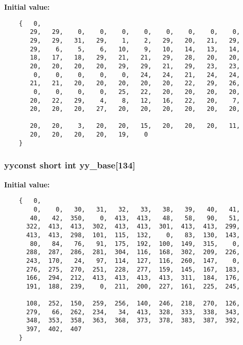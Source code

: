 {\bf Initial value:}

\footnotesize\begin{verbatim}
    {   0,
       29,   29,    0,    0,    0,    0,    0,    0,    0,    0,
       29,   29,   31,   29,    1,    2,   29,   20,   21,   29,
       29,    6,    5,    6,   10,    9,   10,   14,   13,   14,
       18,   17,   18,   29,   21,   21,   29,   28,   20,   20,
       20,   20,   20,   20,   29,   29,   21,   29,   23,   23,
        0,    0,    0,    0,    0,   24,   24,   21,   24,   24,
       21,   21,   20,   20,   20,   20,   20,   22,   29,   26,
        0,    0,    0,    0,   25,   22,   20,   20,   20,   20,
       20,   22,   29,    4,    8,   12,   16,   22,   20,    7,
       20,   20,   20,   27,   20,   20,   20,   20,   20,   20,

       20,   20,    3,   20,   20,   15,   20,   20,   20,   11,
       20,   20,   20,   20,   19,    0
    }\end{verbatim}\normalsize 
{}
\subsubsection{\setlength{\rightskip}{0pt plus 5cm}yyconst short int yy\_\-base[134]\hspace{0.3cm}{\tt  [static]}}\label{vcd__lexer_8c_a90}


{\bf Initial value:}

\footnotesize\begin{verbatim}
    {   0,
        0,    0,   30,   31,   32,   33,   38,   39,   40,   41,
       40,   42,  350,    0,  413,  413,   48,   58,   90,   51,
      322,  413,  413,  302,  413,  413,  301,  413,  413,  299,
      413,  413,  298,  101,  115,  132,    0,   83,  130,  143,
       80,   84,   76,   91,  175,  192,  100,  149,  315,    0,
      288,  287,  286,  281,  304,  116,  168,  302,  209,  226,
      243,  170,   24,   97,  114,  127,  116,  260,  147,    0,
      276,  275,  270,  251,  228,  277,  159,  145,  167,  183,
      166,  294,  212,  413,  413,  413,  413,  311,  184,  176,
      191,  188,  239,    0,  211,  200,  227,  161,  225,  245,

      108,  252,  150,  259,  256,  140,  246,  218,  270,  126,
      279,   66,  262,  234,   34,  413,  328,  333,  338,  343,
      348,  353,  358,  363,  368,  373,  378,  383,  387,  392,
      397,  402,  407
    }\end{verbatim}\normalsize 
{}
